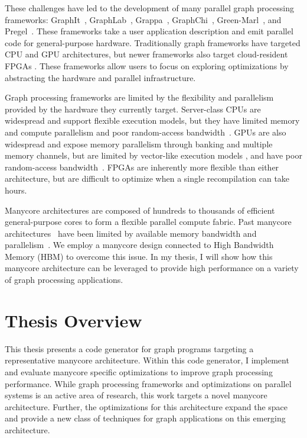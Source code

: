 These challenges have led to the development of many parallel graph processing frameworks: GraphIt~\cite{zhang2018graphit,brahmakshatriya2021compiling,zhang2019optimizing}, GraphLab~\cite{low2010graphlab, low2012distributed}, Grappa~\cite{nelson2015grappa}, GraphChi~\cite{aapo2012graphchi}, Green-Marl~\cite{hong2012green}, and Pregel~\cite{malewicz2010pregel}. 
These frameworks take a user application description and emit parallel code for general-purpose hardware.
Traditionally graph frameworks have targeted CPU and GPU architectures, but newer frameworks also target cloud-resident FPGAs \cite{engelhardt2016gravf, dai2016fpgp}.
These frameworks allow users to focus on exploring optimizations by abstracting the hardware and parallel infrastructure.

Graph processing frameworks are limited by the flexibility and parallelism provided by the hardware they currently target.
Server-class CPUs are widespread and support flexible execution models, but they have limited memory and compute parallelism and poor random-access bandwidth~\citep{beamer2015locality}.
GPUs are also widespread and expose memory parallelism through banking and multiple memory channels, but are limited by vector-like execution models \cite{xu2014graph, shi2018graph}, and have poor random-access bandwidth~\citep{aamodt2018general}.
FPGAs are inherently more flexible than either architecture, but are difficult to optimize when a single recompilation can take hours. 
  
Manycore architectures are composed of hundreds to thousands of efficient general-purpose cores to form a flexible parallel compute fabric.
Past manycore architectures~\cite{ramey2011tilera, agathos2015parallela, gwennap2011adapteva} have been limited by available memory bandwidth and parallelism~\citep{loi2010efficient}.  We employ a manycore design connected to High Bandwidth Memory (HBM) \cite{jedec2020hbm, jouppi2017datacenter} to overcome this issue.
In my thesis, I will show how this manycore architecture can be leveraged to provide high performance on a variety of graph processing applications.


\section{Thesis Overview}
This thesis presents a code generator for graph programs targeting a representative manycore architecture. 
Within this code generator, I implement and evaluate manycore specific optimizations to improve graph processing performance. 
While graph processing frameworks and optimizations on parallel systems is an active area of research, this work targets a novel manycore architecture.
Further, the optimizations for this architecture expand the space and provide a new class of techniques for graph applications on this emerging architecture. 

